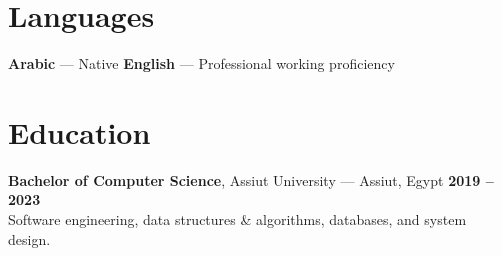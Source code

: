 \documentclass[10pt, letterpaper]{article}
\begin{document}
\section{Languages}
\textbf{Arabic} — Native \textbar{} \textbf{English} — Professional working proficiency

\section{Education}
\textbf{Bachelor of Computer Science}, Assiut University — Assiut, Egypt \hfill \textbf{2019 – 2023} \\
Software engineering, data structures \& algorithms, databases, and system design.
\end{document}
